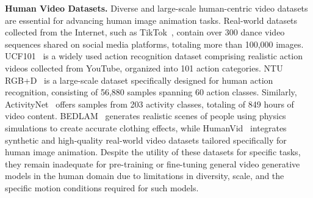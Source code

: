 \noindent\textbf{Human Video Datasets.}
Diverse and large-scale human-centric video datasets are essential for advancing human image animation tasks. Real-world datasets collected from the Internet, such as TikTok~\cite{jafarian2021learning}, contain over 300 dance video sequences shared on social media platforms, totaling more than 100,000 images. UCF101~\cite{soomro2012ucf101} is a widely used action recognition dataset comprising realistic action videos collected from YouTube, organized into 101 action categories. NTU RGB+D~\cite{shahroudy2016ntu} is a large-scale dataset specifically designed for human action recognition, consisting of 56,880 samples spanning 60 action classes. Similarly, ActivityNet~\cite{caba2015activitynet} offers samples from 203 activity classes, totaling of 849 hours of video content. BEDLAM~\cite{black2023bedlam} generates realistic scenes of people using physics simulations to create accurate clothing effects, while HumanVid~\cite{wang2024humanvid} integrates synthetic and high-quality real-world video datasets tailored specifically for human image animation. Despite the utility of these datasets for specific tasks, they remain inadequate for pre-training or fine-tuning general video generative models in the human domain due to limitations in diversity, scale, and the specific motion conditions required for such models.